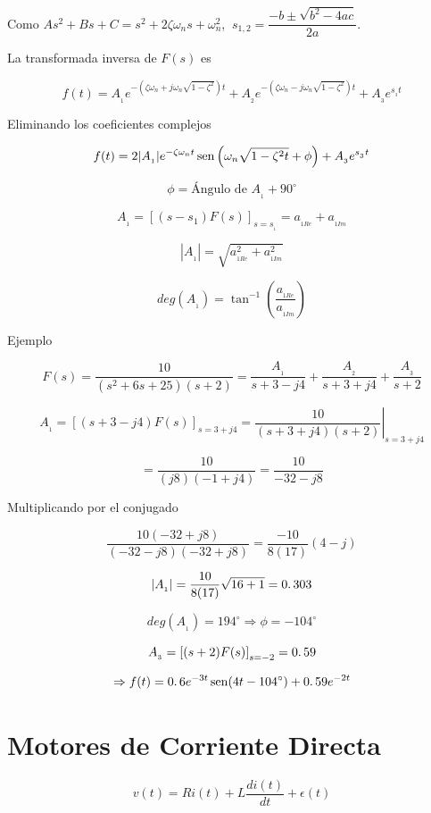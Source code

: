 Como $As^2 + Bs + C = s^2 + 2\zeta \omega_{n}s +\omega_{n}^{2}$, $\: s_{1,2} = \dfrac{- b \pm \sqrt{b^2 - 4ac}}{2a}.$

La transformada inversa de $F(s)$ es

$$f(t) = A_{_{1}} e^{- \left( \zeta \omega_{n} + j\omega_{n} \sqrt{1 - \zeta^2} \right)t } + A_{_2} e^{- \left( \zeta \omega_{n} - j\omega_{n} \sqrt{1 - \zeta^2} \right)t } + A_{_3} e^{s_{_3} t}$$

Eliminando los coeficientes complejos

$$f(t) = 2 |A_{_1}| e^{-\zeta \omega_{n}t} \mathop{\rm sen}\nolimits \left( \omega_{n} \sqrt{1 - \zeta^2 t} + \phi \right) + A_{_3}e^{s_{_3}t}$$

$$\phi = \mbox{Ángulo de } A_{_1} + 90^\circ$$

$$A_{_1} = \left[ (s - s_1)F(s)\right]_{s = s_{_1}} = a_{_{1Re}} + a_{_{1Im}}$$

$$|A_{_1}| = \sqrt{a_{_{1Re}}^2 + a_{_{1Im}}^2}$$

$$deg(A_{_1}) = \tan^{-1} \left( \dfrac{a_{_{1Re}}}{a_{_{1Im}}} \right) $$

Ejemplo

$$F(s) = \dfrac{10}{(s^2 + 6s + 25)(s + 2)} = \dfrac{A_{_1}}{s + 3 - j4} + \dfrac{A_{_2}}{s + 3 + j4} + \dfrac{A_{_3}}{s + 2}$$

$$A_{_1} = \left[ (s + 3 - j4) F(s) \right]_{s = 3 + j4} = \left. \dfrac{10}{(s + 3 + j4)(s + 2)} \right|_{s = 3 + j4}$$

$$= \dfrac{10}{(j8)(-1 + j4)} = \dfrac{10}{-32 - j8}$$

Multiplicando por el conjugado

$$\dfrac{10(-32 + j8)}{(-32 - j8)(-32 + j8)} = \dfrac{-10}{8(17)}(4 - j)$$

$$|A_{_1}| = \dfrac{10}{8(17)} \sqrt{16 + 1} = 0\ldotp303$$

$$deg(A_{_1}) = 194^\circ \Rightarrow \phi = -104^\circ$$

$$A_{_3} = \left[ (s + 2)F(s) \right]_{s = -2} = 0\ldotp59$$

$$\Rightarrow f(t) = 0\ldotp6 e^{-3t} \mathop{\rm sen}\nolimits (4t - 104^\circ) + 0\ldotp59 e^{-2t}$$



\section{Motores de Corriente Directa}


$$v(t) = Ri(t) + L \dfrac{di(t)}{dt} + \epsilon(t)$$

